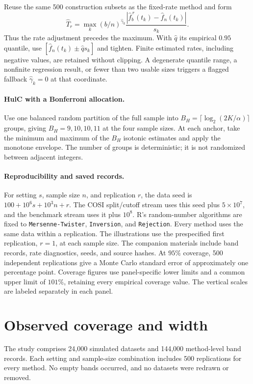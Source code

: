 \documentclass[10pt]{article}
\begin{document}
Reuse the same 500 construction subsets as the fixed-rate method and form
\[
 \widehat T_r=\max_k (b/n)^{\widehat\gamma_k}
   \frac{|\widehat f_b^{\,r}(t_k)-\widehat f_n(t_k)|}{s_k}.
\]
Thus the rate adjustment precedes the maximum. With $\widehat q$ its empirical $0.95$ quantile, use $[\widehat f_n(t_k)\pm\widehat q s_k]$ and tighten. Finite estimated rates, including negative values, are retained without clipping. A degenerate quantile range, a nonfinite regression result, or fewer than two usable sizes triggers a flagged fallback $\widehat\gamma_k=0$ at that coordinate.

\paragraph{HulC with a Bonferroni allocation.}
Use one balanced random partition of the full sample into
$B_H=\lceil\log_2(2K/\alpha)\rceil$ groups, giving $B_H=9,10,10,11$ at the four sample sizes. At each anchor, take the minimum and maximum of the $B_H$ isotonic estimates and apply the monotone envelope. The number of groups is deterministic; it is not randomized between adjacent integers.

\paragraph{Reproducibility and saved records.}
For setting $s$, sample size $n$, and replication $r$, the data seed is
$100+10^6s+10^3n+r$. The COSI split/cutoff stream uses this seed plus $5\times10^7$, and the benchmark stream uses it plus $10^8$. R's random-number algorithms are fixed to \texttt{Mersenne-Twister}, \texttt{Inversion}, and \texttt{Rejection}. Every method uses the same data within a replication. The illustrations use the prespecified first replication, $r=1$, at each sample size. The companion materials include band records, rate diagnostics, seeds, and source hashes. At $95\%$ coverage, 500 independent replications give a Monte Carlo standard error of approximately one percentage point. Coverage figures use panel-specific lower limits and a common upper limit of $101\%$, retaining every empirical coverage value. The vertical scales are labeled separately in each panel.

\section{Observed coverage and width}
The study comprises 24,000 simulated datasets and 144,000 method-level
band records. Each setting and sample-size combination includes 500 replications for
every method. No empty bands occurred, and no datasets were redrawn or removed.
\end{document}
